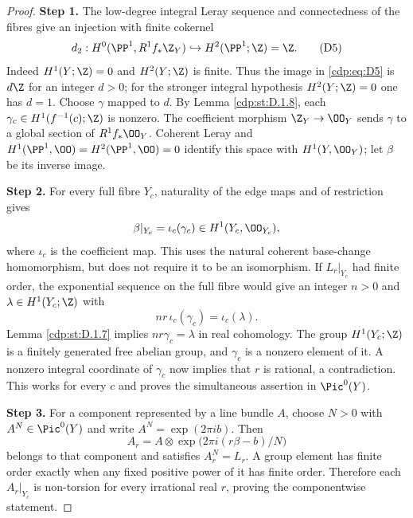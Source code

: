 \begin{proof}
\noindent\textbf{Step 1.} The low-degree integral Leray sequence and connectedness of the
fibres give an injection with finite cokernel
\[
d_2:H^0(\PP^1,R^1f_*\Z_Y)
 \hookrightarrow H^2(\PP^1;\Z)=\Z.                   \tag{D5}\label{cdp:eq:D5}
\]
Indeed $H^1(Y;\Z)=0$ and $H^2(Y;\Z)$ is finite.
Thus the image in \eqref{cdp:eq:D5} is $d\Z$ for an integer $d>0$; for the
stronger integral hypothesis $H^2(Y;\Z)=0$ one has $d=1$.
Choose $\gamma$ mapped to $d$. By Lemma \ref{cdp:st:D.1.8},
each $\gamma_c\in H^1(f^{-1}(c);\Z)$ is nonzero.
The coefficient morphism $\Z_Y\to\OO_Y$ sends $\gamma$ to a
global section of $R^1f_*\OO_Y$. Coherent Leray and
$H^1(\PP^1,\OO)=H^2(\PP^1,\OO)=0$ identify this space with
$H^1(Y,\OO_Y)$; let $\beta$ be its inverse image.

\noindent\textbf{Step 2.} For every full fibre $Y_c$, naturality of the edge maps and of
restriction gives
\[
\beta|_{Y_c}=\iota_c(\gamma_c)\in H^1(Y_c,\OO_{Y_c}), 
\]
where $\iota_c$ is the coefficient map. This uses the natural
coherent base-change homomorphism, but does not require it to be
an isomorphism. If $L_r|_{Y_c}$ had finite order, the exponential
sequence on the full fibre would give an integer $n>0$ and
$\lambda\in H^1(Y_c;\Z)$ with
\[
nr\,\iota_c(\gamma_c)=\iota_c(\lambda).
\]
Lemma \ref{cdp:st:D.1.7} implies $nr\gamma_c=\lambda$ in real cohomology.
The group $H^1(Y_c;\Z)$ is a finitely generated free abelian group,
and $\gamma_c$ is a nonzero element of it. A nonzero integral
coordinate of $\gamma_c$ now implies that $r$ is rational, a
contradiction. This works for every $c$ and proves the simultaneous
assertion in $\Pic^0(Y)$.

\noindent\textbf{Step 3.} For a component represented by a line bundle $A$, choose $N>0$
with $A^N\in\Pic^0(Y)$ and write $A^N=\exp(2\pi i b)$.
Then
\[
A_r=A\otimes\exp\bigl(2\pi i(r\beta-b)/N\bigr)
\]
belongs to that component and satisfies $A_r^N=L_r$. A group
element has finite order exactly when any fixed positive power of
it has finite order. Therefore each $A_r|_{Y_c}$ is non-torsion
for every irrational real $r$, proving the componentwise statement.
\end{proof}
